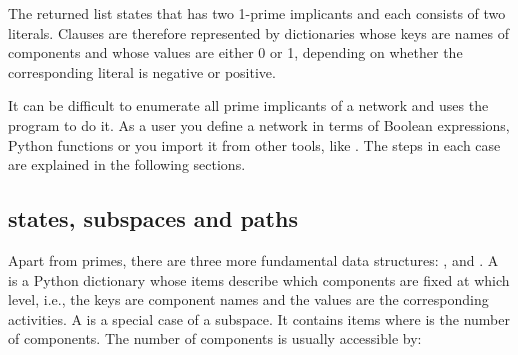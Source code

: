 \documentclass[letterpaper,10pt,english]{sphinxmanual}
\begin{document}
\begin{sphinxVerbatim}[commandchars=\\\{\}]
\PYG{p}{[}\PYG{p}{]}\PYG{p}{[}\PYG{p}{]}
\end{sphinxVerbatim}

The returned list states that  has two 1-prime implicants and each consists of two literals.
Clauses are therefore represented by dictionaries whose keys are names of components and whose values are either 0 or 1,
depending on whether the corresponding literal is negative or positive.

It can be difficult to enumerate all prime implicants of a network and  uses the program {\hyperref[\detokenize{Installation:installation-bnettoprime}]{}} to do it.
As a user you define a network in terms of Boolean expressions, Python functions or you import it from other tools, like .
The steps in each case are explained in the following sections.


\subsection{states, subspaces and paths}
\label{\detokenize{Manual:states-subspaces-paths}}\label{\detokenize{Manual:states-subspaces-and-paths}}
Apart from primes, there are three more fundamental data structures: ,  and .
A  is a Python dictionary whose items describe which components are fixed at which level, i.e., the keys are component names and the values are the corresponding activities.
A  is a special case of a subspace.
It contains  items where  is the number of components.
The number of components is usually accessible by:

\begin{sphinxVerbatim}[commandchars=\\\{\}]
  
\end{sphinxVerbatim}
\end{document}
